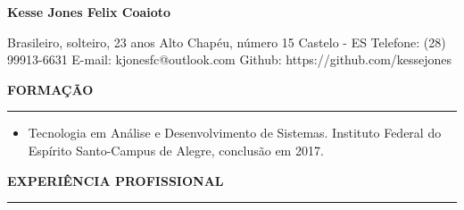\documentclass[a4paper,10pt]{article}
\begin{document}

\begin{flushleft}
    \begin{huge}
        \textbf{Kesse Jones Felix Coaioto}
    \end{huge}
\end{flushleft}

\begin{flushleft}
    Brasileiro, solteiro, 23 anos
    \newline
    Alto Chap\'{e}u, n\'{u}mero 15
    \newline
    Castelo - ES
    \newline
    Telefone: (28) 99913-6631
    \newline
    E-mail: kjonesfc@outlook.com
    \newline
    Github: https://github.com/kessejones
    \newline
\end{flushleft}

\begin{flushleft}
\textbf{FORMA\c{C}\~{A}O}
\noindent\textcolor{gray}{\rule{18cm}{1px}}
\end{flushleft}

\begin{flushleft}
\begin{itemize}
    \item Tecnologia em An\'{a}lise e Desenvolvimento de Sistemas. Instituto Federal do Esp\'{i}rito Santo-Campus de Alegre, conclus\~{a}o em 2017.
    \newline
\end{itemize}
\end{flushleft}

\begin{flushleft}
\textbf{EXPERI\^{E}NCIA PROFISSIONAL}
\noindent\textcolor{gray}{\rule{18cm}{1px}}
\end{flushleft}
\end{document}
